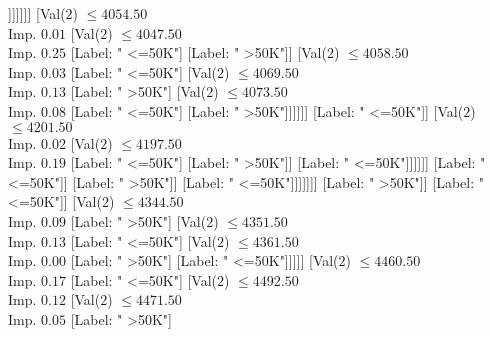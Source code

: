 \documentclass[margin=10pt]{standalone}
\begin{document}
\begin{forest}
																																											[Label: " >50K"]
																																											[Label: " <=50K"]]]]]]]
																																					[Val($2$) $ \leq 4054.50$ \\ Imp. $0.01$
																																						[Val($2$) $ \leq 4047.50$ \\ Imp. $0.25$
																																							[Label: " <=50K"]
																																							[Label: " >50K"]]
																																						[Val($2$) $ \leq 4058.50$ \\ Imp. $0.03$
																																							[Label: " <=50K"]
																																							[Val($2$) $ \leq 4069.50$ \\ Imp. $0.13$
																																								[Label: " >50K"]
																																								[Val($2$) $ \leq 4073.50$ \\ Imp. $0.08$
																																									[Label: " <=50K"]
																																									[Label: " >50K"]]]]]]
																																				[Label: " <=50K"]]
																																			[Val($2$) $ \leq 4201.50$ \\ Imp. $0.02$
																																				[Val($2$) $ \leq 4197.50$ \\ Imp. $0.19$
																																					[Label: " <=50K"]
																																					[Label: " >50K"]]
																																				[Label: " <=50K"]]]]]]
																															[Label: " <=50K"]]
																														[Label: " >50K"]]
																													[Label: " <=50K"]]]]]]]
																							[Label: " >50K"]]
																						[Label: " <=50K"]]
																					[Val($2$) $ \leq 4344.50$ \\ Imp. $0.09$
																						[Label: " >50K"]
																						[Val($2$) $ \leq 4351.50$ \\ Imp. $0.13$
																							[Label: " <=50K"]
																							[Val($2$) $ \leq 4361.50$ \\ Imp. $0.00$
																								[Label: " >50K"]
																								[Label: " <=50K"]]]]]
																				[Val($2$) $ \leq 4460.50$ \\ Imp. $0.17$
																					[Label: " <=50K"]
																					[Val($2$) $ \leq 4492.50$ \\ Imp. $0.12$
																						[Val($2$) $ \leq 4471.50$ \\ Imp. $0.05$
																							[Label: " >50K"]

\end{forest}
\end{document}
